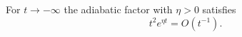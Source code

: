 \documentclass{article}
\begin{document}
For $t\to-\infty$ the adiabatic factor with $\eta>0$ satisfies
\begin{equation}
t^2 e^{\eta t} = O(t^{-1}) .
\label{eq:tail}
\end{equation}
\end{document}
